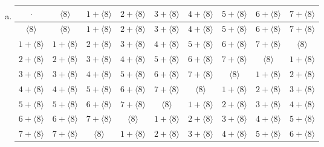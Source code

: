 \begin{enumerate}[(a)]
\item
\begin{center}
\begin{tabular}{c|cccccccc}
$\cdot$             & $\langle 8 \rangle$ & $1 + \langle 8 \rangle$ & $2 + \langle 8 \rangle$ & $3 + \langle 8 \rangle$ & $4 + \langle 8 \rangle$ & $5 + \langle 8 \rangle$ & $6 + \langle 8 \rangle$ & $7 + \langle 8 \rangle$\\\hline
$\langle 8 \rangle$  & $\langle 8 \rangle$ & $1 + \langle 8 \rangle$ & $2 + \langle 8 \rangle$ & $3 + \langle 8 \rangle$ & $4 + \langle 8 \rangle$ & $5 + \langle 8 \rangle$ & $6 + \langle 8 \rangle$ & $7 + \langle 8 \rangle$\\
$1 + \langle 8 \rangle$ & $1 + \langle 8 \rangle$ & $2 + \langle 8 \rangle$ & $3 + \langle 8 \rangle$ & $4 + \langle 8 \rangle$ & $5 + \langle 8 \rangle$ & $6 + \langle 8 \rangle$ & $7 + \langle 8 \rangle$ & $\langle 8 \rangle$ \\
$2 + \langle 8 \rangle$ & $2 + \langle 8 \rangle$ & $3 + \langle 8 \rangle$ & $4 + \langle 8 \rangle$ & $5 + \langle 8 \rangle$ & $6 + \langle 8 \rangle$ & $7 + \langle 8 \rangle$  & $\langle 8 \rangle$ & $1 + \langle 8 \rangle$ \\
$3 + \langle 8 \rangle$ & $3 + \langle 8 \rangle$ & $4 + \langle 8 \rangle$ & $5 + \langle 8 \rangle$ & $6 + \langle 8 \rangle$ & $7 + \langle 8 \rangle$ & $\langle 8 \rangle$ & $1 + \langle 8 \rangle$ & $2 + \langle 8 \rangle$ \\
$4 + \langle 8 \rangle$ & $4 + \langle 8 \rangle$ & $5 + \langle 8 \rangle$ & $6 + \langle 8 \rangle$ & $7 + \langle 8 \rangle$ &  $\langle 8 \rangle$ & $1 + \langle 8 \rangle$ & $2 + \langle 8 \rangle$ & $3 + \langle 8 \rangle$ \\
$5 + \langle 8 \rangle$ & $5 + \langle 8 \rangle$ & $6 + \langle 8 \rangle$ & $7 + \langle 8 \rangle$ & $\langle 8 \rangle$ & $1 + \langle 8 \rangle$ & $2 + \langle 8 \rangle$ & $3 + \langle 8 \rangle$ & $4 + \langle 8 \rangle$ \\
$6 + \langle 8 \rangle$ & $6 + \langle 8 \rangle$ & $7 + \langle 8 \rangle$ & $\langle 8 \rangle$ & $1 + \langle 8 \rangle$ & $2 + \langle 8 \rangle$ & $3 + \langle 8 \rangle$ & $4 + \langle 8 \rangle$ & $5 + \langle 8 \rangle$ \\
$7 + \langle 8 \rangle$ & $7 + \langle 8 \rangle$ & $\langle 8 \rangle$ & $1 + \langle 8 \rangle$ & $2 + \langle 8 \rangle$ & $3 + \langle 8 \rangle$ & $4 + \langle 8 \rangle$ & $5 + \langle 8 \rangle$ & $6 + \langle 8 \rangle$ 
\end{tabular}
\end{center}
 

\end{enumerate}
